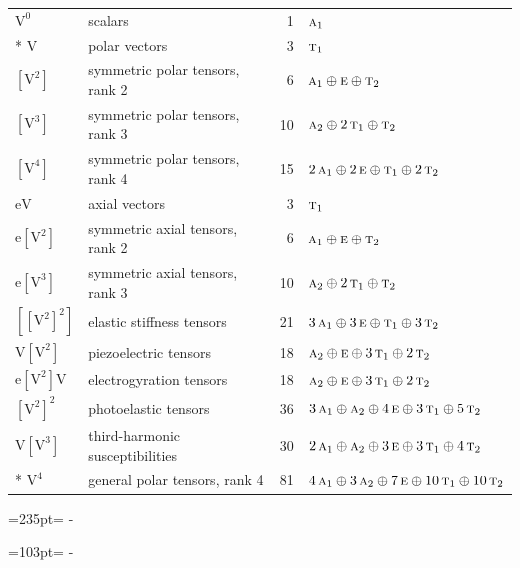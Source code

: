 \documentclass[10pt,a4paper]{article}
\newcommand{\needspace}[1]{\par\penalty-100\begingroup\dimen0=#1\relax\dimen2=\pagegoal
  \advance\dimen2-\pagetotal\ifdim\dimen0>\dimen2\relax\ifdim\dimen2>0pt\vfil\break\fi\fi
  \endgroup}
\numberwithin{equation}{section}
\newcommand{\irr}[1]{\text{\normalfont\scshape #1}}
\newcommand{\jahn}[1]{\mathrm{#1}}
\newlength{\fillwidth}\newlength{\cellwidth}\newlength{\colwidth}
\begin{document}
{\begin{longtable}{@{}llr>{\RaggedRight\arraybackslash}p{\fillwidth}@{}}
$\jahn{V^{0}}$ & scalars & 1 & $\irr{a}_{1}$\\*
$\jahn{V}$ & polar vectors & 3 & $\irr{t}_{1}$\\
$\jahn{[V^{2}]}$ & symmetric polar tensors, rank 2 & 6 & $\irr{a}_{1} \oplus\allowbreak \irr{e} \oplus\allowbreak \irr{t}_{2}$\\
$\jahn{[V^{3}]}$ & symmetric polar tensors, rank 3 & 10 & $\irr{a}_{2} \oplus\allowbreak 2\,\irr{t}_{1} \oplus\allowbreak \irr{t}_{2}$\\
$\jahn{[V^{4}]}$ & symmetric polar tensors, rank 4 & 15 & $2\,\irr{a}_{1} \oplus\allowbreak 2\,\irr{e} \oplus\allowbreak \irr{t}_{1} \oplus\allowbreak 2\,\irr{t}_{2}$\\
$\jahn{eV}$ & axial vectors & 3 & $\irr{t}_{1}$\\
$\jahn{e[V^{2}]}$ & symmetric axial tensors, rank 2 & 6 & $\irr{a}_{1} \oplus\allowbreak \irr{e} \oplus\allowbreak \irr{t}_{2}$\\
$\jahn{e[V^{3}]}$ & symmetric axial tensors, rank 3 & 10 & $\irr{a}_{2} \oplus\allowbreak 2\,\irr{t}_{1} \oplus\allowbreak \irr{t}_{2}$\\
$\jahn{[[V^{2}]^{2}]}$ & elastic stiffness tensors & 21 & $3\,\irr{a}_{1} \oplus\allowbreak 3\,\irr{e} \oplus\allowbreak \irr{t}_{1} \oplus\allowbreak 3\,\irr{t}_{2}$\\
$\jahn{V[V^{2}]}$ & piezoelectric tensors & 18 & $\irr{a}_{2} \oplus\allowbreak \irr{e} \oplus\allowbreak 3\,\irr{t}_{1} \oplus\allowbreak 2\,\irr{t}_{2}$\\
$\jahn{e[V^{2}]V}$ & electrogyration tensors & 18 & $\irr{a}_{2} \oplus\allowbreak \irr{e} \oplus\allowbreak 3\,\irr{t}_{1} \oplus\allowbreak 2\,\irr{t}_{2}$\\
$\jahn{[V^{2}]^{2}}$ & photoelastic tensors & 36 & $3\,\irr{a}_{1} \oplus\allowbreak \irr{a}_{2} \oplus\allowbreak 4\,\irr{e} \oplus\allowbreak 3\,\irr{t}_{1} \oplus\allowbreak 5\,\irr{t}_{2}$\\
$\jahn{V[V^{3}]}$ & third-harmonic susceptibilities & 30 & $2\,\irr{a}_{1} \oplus\allowbreak \irr{a}_{2} \oplus\allowbreak 3\,\irr{e} \oplus\allowbreak 3\,\irr{t}_{1} \oplus\allowbreak 4\,\irr{t}_{2}$\\*
$\jahn{V^{4}}$ & general polar tensors, rank 4 & 81 & $4\,\irr{a}_{1} \oplus\allowbreak 3\,\irr{a}_{2} \oplus\allowbreak 7\,\irr{e} \oplus\allowbreak 10\,\irr{t}_{1} \oplus\allowbreak 10\,\irr{t}_{2}$\\
\bottomrule\end{longtable}}
\needspace{235pt}
\needspace{103pt}
\end{document}

